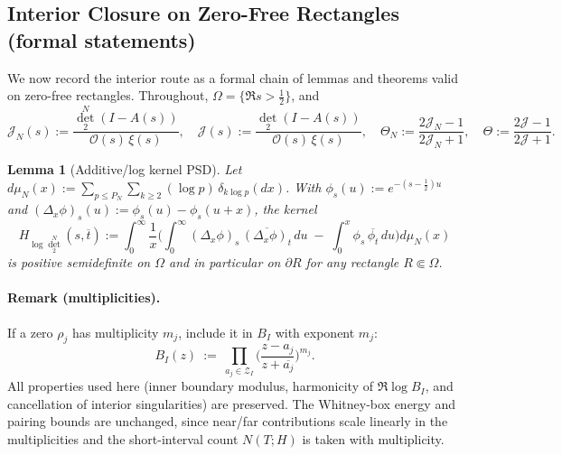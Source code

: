 \documentclass[11pt]{article}
\newtheorem{lemma}[theorem]{Lemma}
\theoremstyle{definition}
\theoremstyle{remark}
\begin{document}
\subsection*{Interior Closure on Zero-Free Rectangles (formal statements)}
We now record the interior route as a formal chain of lemmas and theorems valid on zero-free rectangles. Throughout, \(\Omega=\{\Re s>\tfrac12\}\), and
\[\mathcal J_N(s):=\frac{\det_2^N(I-A(s))}{\mathcal O(s)\,\xi(s)},\quad \mathcal J(s):=\frac{\det_2(I-A(s))}{\mathcal O(s)\,\xi(s)},\quad \Theta_N:=\frac{2\mathcal J_N-1}{2\mathcal J_N+1},\quad \Theta:=\frac{2\mathcal J-1}{2\mathcal J+1}.
\]

\begin{lemma}[Additive/log kernel PSD]\label{lem:log-psd-formal}
Let \(d\mu_N(x):=\sum_{p\le P_N}\sum_{k\ge2}(\log p)\,\delta_{k\log p}(dx)\). With \(\phi_s(u):=e^{-(s-\frac12)u}\) and \((\Delta_x\phi)_s(u):=\phi_s(u)-\phi_s(u+x)\), the kernel
\[H_{\log\det_2^N}(s,\overline t):=\int_0^\infty \frac{1}{x}\Big(\int_0^\infty (\Delta_x\phi)_s\,\overline{(\Delta_x\phi)_t}\,du\; -\; \int_0^x \phi_s\,\overline{\phi_t}\,du\Big)d\mu_N(x)
\]
is positive semidefinite on \(\Omega\) and in particular on \(\partial R\) for any rectangle \(R\Subset\Omega\).
\end{lemma}

\paragraph{Remark (multiplicities).}
If a zero $\rho_j$ has multiplicity $m_j$, include it in $B_I$ with exponent $m_j$:
\[
 B_I(z)\ :=\ \prod_{a_j\in\mathcal Z_I}\Big(\frac{z-a_j}{z+\overline{a_j}}\Big)^{m_j}.
\]
All properties used here (inner boundary modulus, harmonicity of $\Re\log B_I$, and cancellation of interior singularities) are preserved. The Whitney-box energy and pairing bounds are unchanged, since near/far contributions scale linearly in the multiplicities and the short-interval count $N(T;H)$ is taken with multiplicity.
\end{document}
